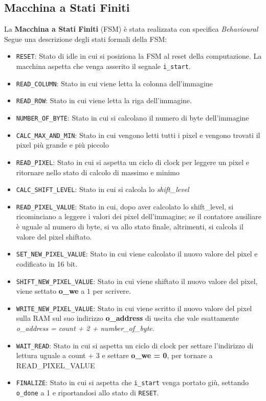 \documentclass{article}
\begin{document}
\subsection{Macchina a Stati Finiti}
\label{FSM}

La \textbf{Macchina a Stati Finiti} (FSM) è stata realizzata con specifica \textit{Behavioural} 
Segue una descrizione degli stati formali della FSM:

\begin{itemize}
\item \texttt{RESET}: Stato di idle in cui si posiziona la FSM al reset della computazione. La macchina aspetta che venga asserito il segnale \texttt{i\_start}.
\item \texttt{READ\_COLUMN}: Stato in cui viene letta la colonna dell'immagine
\item \texttt{READ\_ROW}: Stato in cui viene letta la riga dell'immagine.
\item \texttt{NUMBER\_OF\_BYTE}: Stato in cui si calcolano il numero di byte dell'immagine
\item \texttt{CALC\_MAX\_AND\_MIN}: Stato in cui vengono letti tutti i pixel e vengono trovati il pixel più grande e più piccolo
\item \texttt{READ\_PIXEL}: Stato in cui si aspetta un ciclo di clock per leggere un pixel e ritornare nello stato di calcolo di massimo e minimo 
\item \texttt{CALC\_SHIFT\_LEVEL}: Stato in cui si calcola lo \textit{shift\_level}
\item \texttt{READ\_PIXEL\_VALUE}: Stato in cui, dopo aver calcolato lo shift\_level, si ricominciano a leggere i valori dei pixel dell'immagine; se il contatore ausiliare è uguale al numero di byte, si va allo stato finale, altrimenti, si calcola il valore del pixel shiftato.
\item \texttt{SET\_NEW\_PIXEL\_VALUE}: Stato in cui viene calcolato il nuovo valore del pixel e codificato in 16 bit.
\item \texttt{SHIFT\_NEW\_PIXEL\_VALUE}: Stato in cui viene shiftato il nuovo valore del pixel, viene settato \textbf{o\_we} a $1$ per scrivere.
\item \texttt{WRITE\_NEW\_PIXEL\_VALUE}: Stato in cui viene scritto il nuovo valore del pixel sulla RAM sul suo indirizzo \textbf{o\_address} di uscita che vale esattamente \textit{o\_address = count + 2 + number\_of\_byte}.
\item \texttt{WAIT\_READ}: Stato in cui si aspetta un ciclo di clock per settare l'indirizzo di lettura uguale a count + 3 e settare \textbf{o\_we = 0}, per tornare a READ\_PIXEL\_VALUE
\item \texttt{FINALIZE}: Stato in cui si aspetta che \texttt{i\_start} venga portato giù, settando \texttt{o\_done} a 1 e riportandosi allo stato di \texttt{RESET}.
\end{itemize}
\end{document}
